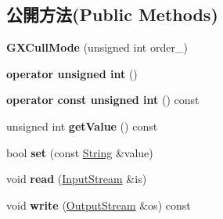 \subsection*{公開方法(Public Methods)}
\begin{DoxyCompactItemize}
\item 
{\bfseries G\+X\+Cull\+Mode} (unsigned int order\+\_)\hypertarget{class_magnum_1_1_g_x_cull_mode_af76ad2b5b812d8b7cb80616a727a40f0}{}\label{class_magnum_1_1_g_x_cull_mode_af76ad2b5b812d8b7cb80616a727a40f0}

\item 
{\bfseries operator unsigned int} ()\hypertarget{class_magnum_1_1_g_x_cull_mode_acf351635c1e7199648d308dd3ff74009}{}\label{class_magnum_1_1_g_x_cull_mode_acf351635c1e7199648d308dd3ff74009}

\item 
{\bfseries operator const unsigned int} () const \hypertarget{class_magnum_1_1_g_x_cull_mode_a6b498cd6d202e4a28ef725a3ecf6d6c7}{}\label{class_magnum_1_1_g_x_cull_mode_a6b498cd6d202e4a28ef725a3ecf6d6c7}

\item 
unsigned int {\bfseries get\+Value} () const \hypertarget{class_magnum_1_1_g_x_cull_mode_a4e50a2c95a1efad1ea2989b3992b708d}{}\label{class_magnum_1_1_g_x_cull_mode_a4e50a2c95a1efad1ea2989b3992b708d}

\item 
bool {\bfseries set} (const \hyperlink{class_magnum_1_1_string}{String} \&value)\hypertarget{class_magnum_1_1_g_x_cull_mode_a16a8f638cc3a82d03aec450f3af902e9}{}\label{class_magnum_1_1_g_x_cull_mode_a16a8f638cc3a82d03aec450f3af902e9}

\item 
void {\bfseries read} (\hyperlink{class_magnum_1_1_input_stream}{Input\+Stream} \&is)\hypertarget{class_magnum_1_1_g_x_cull_mode_ae9cffdfe23a91342a9319195b809ad1e}{}\label{class_magnum_1_1_g_x_cull_mode_ae9cffdfe23a91342a9319195b809ad1e}

\item 
void {\bfseries write} (\hyperlink{class_magnum_1_1_output_stream}{Output\+Stream} \&os) const \hypertarget{class_magnum_1_1_g_x_cull_mode_a0b5146ed43a58aea4fe56d2439ddbd61}{}\label{class_magnum_1_1_g_x_cull_mode_a0b5146ed43a58aea4fe56d2439ddbd61}

\end{DoxyCompactItemize}
